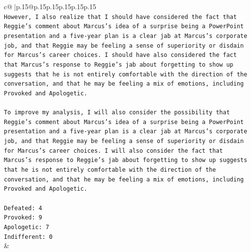 \documentclass{article}
\begin{document}
{\begin{supertabular}{c@{$\;$}|p{.15\linewidth}@{}p{.15\linewidth}p{.15\linewidth}p{.15\linewidth}p{.15\linewidth}p{.15\linewidth}}
{{{\\ 
\texttt{However, I also realize that I should have considered the fact that Reggie's comment about Marcus's idea of a surprise being a PowerPoint presentation and a five{-}year plan is a clear jab at Marcus's corporate job, and that Reggie may be feeling a sense of superiority or disdain for Marcus's career choices. I should have also considered the fact that Marcus's response to Reggie's jab about forgetting to show up suggests that he is not entirely comfortable with the direction of the conversation, and that he may be feeling a mix of emotions, including Provoked and Apologetic.} \\
\\ 
\texttt{To improve my analysis, I will also consider the possibility that Reggie's comment about Marcus's idea of a surprise being a PowerPoint presentation and a five{-}year plan is a clear jab at Marcus's corporate job, and that Reggie may be feeling a sense of superiority or disdain for Marcus's career choices. I will also consider the fact that Marcus's response to Reggie's jab about forgetting to show up suggests that he is not entirely comfortable with the direction of the conversation, and that he may be feeling a mix of emotions, including Provoked and Apologetic.} \\
\\ 
\texttt{Defeated: 4} \\
\texttt{Provoked: 9} \\
\texttt{Apologetic: 7} \\
\texttt{Indifferent: 0} \\
            }
        }
    }
    & \\ \\

\end{supertabular}
}
\end{document}
